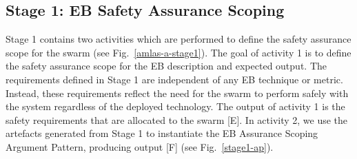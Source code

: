 \documentclass[runningheads]{llncs}
\begin{document}
\subsection{Stage 1: EB Safety Assurance Scoping} \label{framework-stage1}
Stage 1 contains two activities which are performed to define the safety assurance scope for the swarm (see Fig.~\ref{amlas-a-stage1}). 
The goal of activity 1 is to define the safety assurance scope for the EB description and expected output. 
The requirements defined in Stage 1 are independent of any EB technique or metric. Instead, these requirements reflect the need for the swarm to perform safely with the system regardless of the deployed technology. 
The output of activity 1 is the safety requirements that are allocated to the swarm [E].
In activity 2, we use the artefacts generated from Stage 1 to instantiate the EB Assurance Scoping Argument Pattern, producing output [F] (see Fig.~\ref{stage1-ap}). 
\end{document}
